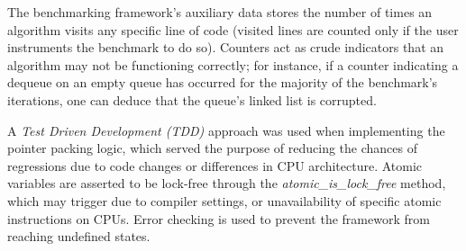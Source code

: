 The benchmarking framework's auxiliary data stores the number of times an
algorithm visits any specific line of code (visited lines are counted only if
the user instruments the benchmark to do so). Counters act as crude indicators that an
algorithm may not be functioning correctly; for instance, if a counter indicating a
dequeue on an empty queue has occurred for the majority of the benchmark's
iterations, one can deduce that the queue's linked list is corrupted. 

A \emph{Test Driven Development (TDD)} approach was used when implementing the
pointer packing logic, which served the purpose of reducing the chances of
regressions due to code changes or differences in CPU architecture. Atomic
variables are asserted to be lock-free through the
\emph{atomic\_is\_lock\_free} method, which may trigger due to compiler settings,
or unavailability of specific atomic instructions on CPUs. Error checking is
used to prevent the framework from reaching undefined states.